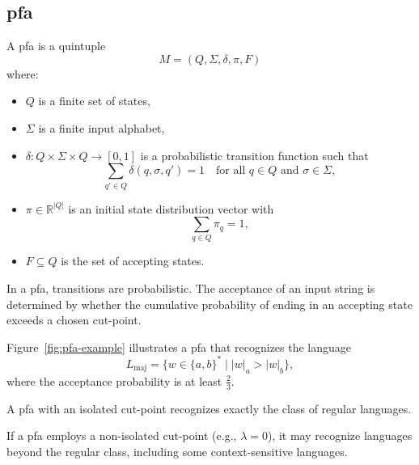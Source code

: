 
\subsection{\acrfull{pfa}}
\label{subsec:pfa}

\begin{definition}
A \gls{pfa} is a quintuple 
\[
M = (Q, \Sigma, \delta, \pi, F)
\]
where:
\begin{itemize}
    \item \( Q \) is a finite set of states,
    \item \( \Sigma \) is a finite input alphabet,
    \item \( \delta: Q \times \Sigma \times Q \rightarrow [0,1] \) is a probabilistic transition function such that 
    \[
    \sum_{q' \in Q} \delta(q, \sigma, q') = 1 \quad \text{for all } q \in Q \text{ and } \sigma \in \Sigma,
    \]
    \item \( \pi \in \mathbb{R}^{|Q|} \) is an initial state distribution vector with 
    \[
    \sum_{q \in Q} \pi_q = 1,
    \]
    \item \( F \subseteq Q \) is the set of accepting states.
\end{itemize}
\end{definition}

\begin{remark}
In a \gls{pfa}, transitions are probabilistic. The acceptance of an input string is determined by whether the cumulative probability of ending in an accepting state exceeds a chosen cut-point.
\end{remark}

\begin{example}
Figure~\ref{fig:pfa-example} illustrates a \gls{pfa} that recognizes the language 
\[
L_{\text{maj}} = \{ w \in \{a,b\}^* \mid |w|_a > |w|_b \},
\]
where the acceptance probability is at least \( \frac{2}{3} \).
\end{example}

\begin{theorem}
\label{thm:rabin}
A \gls{pfa} with an isolated cut-point recognizes exactly the class of regular languages.
\end{theorem}

\begin{proposition}
If a \gls{pfa} employs a non-isolated cut-point (e.g., \(\lambda = 0\)), it may recognize languages beyond the regular class, including some context-sensitive languages.
\end{proposition}

